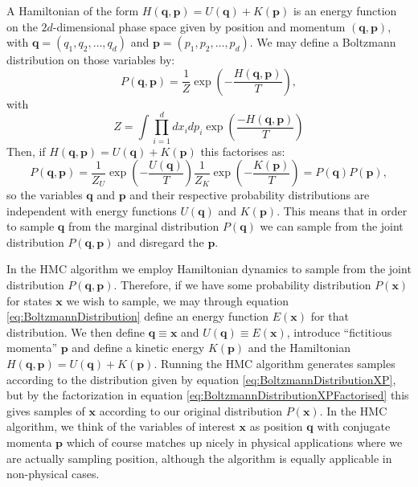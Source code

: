 \documentclass[12pt]{article}
\begin{document}
            A Hamiltonian of the form $H\left(\bm{q},\bm{p}\right)=U\left(\bm{q}\right)+K\left(\bm{p}\right)$ is an energy function on the $2d$-dimensional phase space given by position and momentum $\left(\bm{q},\bm{p}\right)$, with $\bm{q} = \left(q_{1},q_{2},\dots,q_{d}\right)$ and $\bm{p} = \left(p_{1},p_{2},\dots,p_{d}\right)$. We may define a Boltzmann distribution on those variables by:
            \begin{equation}
                \label{eq:BoltzmannDistributionXP}
                P\left(\bm{q},\bm{p}\right) = \frac{1}{Z}\exp{\left(-\frac{H\left(\bm{q},\bm{p}\right)}{T} \right)},
            \end{equation}
            with 
            \begin{equation}
                Z = \int\prod_{i=1}^{d}dx_{i}dp_{i} \exp{\left(\frac{-H\left(\bm{q},\bm{p}\right)}{T}\right)}
            \end{equation}
            Then, if $H\left(\bm{q},\bm{p}\right) = U\left(\bm{q}\right) + K\left(\bm{p}\right)$ this factorises as:
            \begin{equation}
                \label{eq:BoltzmannDistributionXPFactorised}
                P\left(\bm{q},\bm{p}\right) = \frac{1}{Z_U}\exp{\left(-\frac{U\left(\bm{q}\right)}{T} \right)}\frac{1}{Z_K}\exp{\left(-\frac{K\left(\bm{p}\right)}{T} \right)} = P\left(\bm{q}\right) P\left(\bm{p}\right),
            \end{equation}
            so the variables $\bm{q}$ and $\bm{p}$ and their respective probability distributions are independent with energy functions $U\left(\bm{q}\right)$ and $K\left(\bm{p}\right)$. This means that in order to sample $\bm{q}$ from the marginal distribution $P\left(\bm{q}\right)$ we can sample from the joint distribution $P\left(\bm{q},\bm{p}\right)$ and disregard the $\bm{p}$. 

            In the HMC algorithm we employ Hamiltonian dynamics to sample from the joint distribution $P\left(\bm{q},\bm{p}\right)$. Therefore, if we have some probability distribution $P\left(\bm{x}\right)$ for states $\bm{x}$ we wish to sample, we may through equation \ref{eq:BoltzmannDistribution} define an energy function $E\left(\bm{x}\right)$ for that distribution. We then define $\bm{q}\equiv\bm{x}$ and $U\left(\bm{q}\right) \equiv E\left(\bm{x}\right)$, introduce ``fictitious momenta'' $\bm{p}$ and define a kinetic energy $K\left(\bm{p}\right)$ and the Hamiltonian $H\left(\bm{q},\bm{p}\right) = U\left(\bm{q}\right) + K\left(\bm{p}\right)$. Running the HMC algorithm generates samples according to the distribution given by equation \ref{eq:BoltzmannDistributionXP}, but by the factorization in equation \ref{eq:BoltzmannDistributionXPFactorised} this gives samples of $\bm{x}$ according to our original distribution $P\left(\bm{x}\right)$. In the HMC algorithm, we think of the variables of interest $\bm{x}$ as position $\bm{q}$ with conjugate momenta $\bm{p}$ which of course matches up nicely in physical applications where we are actually sampling position, although the algorithm is equally applicable in non-physical cases.
\end{document}
